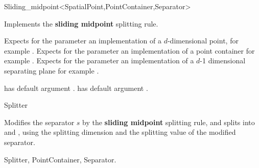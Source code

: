 

\begin{ccRefFunctionObjectClass}{Sliding_midpoint<SpatialPoint,PointContainer,Separator>}  %


\ccDefinition
Implements the {\bf sliding midpoint} splitting rule.

\ccParameters

Expects for the parameter  an implementation of a $d$-dimensional point,
for example . Expects for the parameter  an implementation
of a point container for example .
Expects for the parameter  an implementation of a $d$-1 dimensional 
separating plane for example .

 has default argument .
 has default argument . 



\ccIsModel

Splitter

\ccTypes




\ccOperations

{Modifies the separator $s$ by the {\bf sliding midpoint} splitting rule, 
and splits  into  and ,
using the splitting dimension and the splitting value of the modified separator.
}

\ccSeeAlso

Splitter, PointContainer, Separator.
\end{ccRefFunctionObjectClass}


